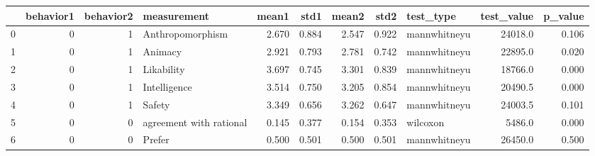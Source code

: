 \begin{tabular}{lrrlrrrrlrr}
\toprule
{} &  behavior1 &  behavior2 &              measurement &  mean1 &   std1 &  mean2 &   std2 &     test\_type &  test\_value &  p\_value \\
\midrule
0 &          0 &          1 &         Anthropomorphism &  2.670 &  0.884 &  2.547 &  0.922 &  mannwhitneyu &     24018.0 &    0.106 \\
1 &          0 &          1 &                  Animacy &  2.921 &  0.793 &  2.781 &  0.742 &  mannwhitneyu &     22895.0 &    0.020 \\
2 &          0 &          1 &               Likability &  3.697 &  0.745 &  3.301 &  0.839 &  mannwhitneyu &     18766.0 &    0.000 \\
3 &          0 &          1 &             Intelligence &  3.514 &  0.750 &  3.205 &  0.854 &  mannwhitneyu &     20490.5 &    0.000 \\
4 &          0 &          1 &                   Safety &  3.349 &  0.656 &  3.262 &  0.647 &  mannwhitneyu &     24003.5 &    0.101 \\
5 &          0 &          0 &  agreement with rational &  0.145 &  0.377 &  0.154 &  0.353 &      wilcoxon &      5486.0 &    0.000 \\
6 &          0 &          0 &                   Prefer &  0.500 &  0.501 &  0.500 &  0.501 &  mannwhitneyu &     26450.0 &    0.500 \\
\bottomrule
\end{tabular}
